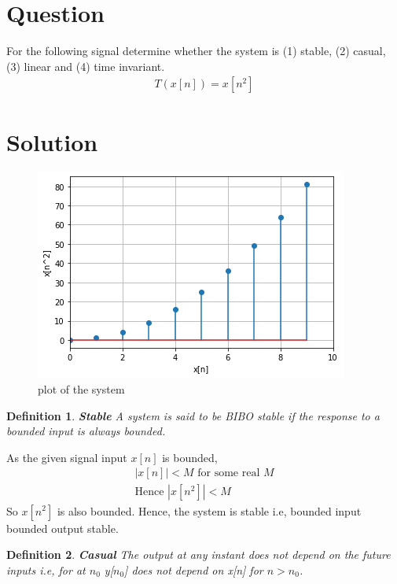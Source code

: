 \documentclass[journal,12pt,twocolumn]{IEEEtran}
\newtheorem{definition}{Definition}[section]
\begin{document}
\section{Question}
For the following signal determine whether the system is (1) stable, (2) casual, (3) linear and (4) time invariant.
\begin{align}
    T(x[n])=x[n^{2}]
\end{align}
\section{Solution}
\begin{figure}[htp]
    \centering
    \includegraphics[width=\columnwidth]{fig.png}
    \caption{plot of the system}
\end{figure}
\begin{definition}{\textbf{Stable}}
A system is said to be BIBO stable if the response to a bounded input is always bounded.
\end{definition} 

As the given signal input $x[n]$ is bounded,
\begin{align}
   |x[n]| < M \text{   for some real $M$}\\
   \text{Hence  } |x[n^{2}]| < M
\end{align}
So $x[n^{2}]$ is also bounded. Hence, the system is stable i.e, bounded input bounded output stable.\\

\begin{definition}{\textbf{Casual}}
 The output at any instant does not depend on the future inputs i.e, for at $n_{0}$ y[$n_{0}$] does not depend on x[n] for $n>n_{0}$.
\end{definition}
\end{document}
